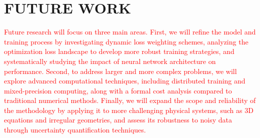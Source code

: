 \documentclass[12pt,fleqn]{article}
\begin{document}
\section{FUTURE WORK}

\textcolor{red}{Future research will focus on three main areas. First, we will refine the model and training process by investigating dynamic loss weighting schemes, analyzing the optimization loss landscape to develop more robust training strategies, and systematically studying the impact of neural network architecture on performance. Second, to address larger and more complex problems, we will explore advanced computational techniques, including distributed training and mixed-precision computing, along with a formal cost analysis compared to traditional numerical methods. Finally, we will expand the scope and reliability of the methodology by applying it to more challenging physical systems, such as 3D equations and irregular geometries, and assess its robustness to noisy data through uncertainty quantification techniques.}

\fontsize{11}{0}\selectfont
\end{document}
